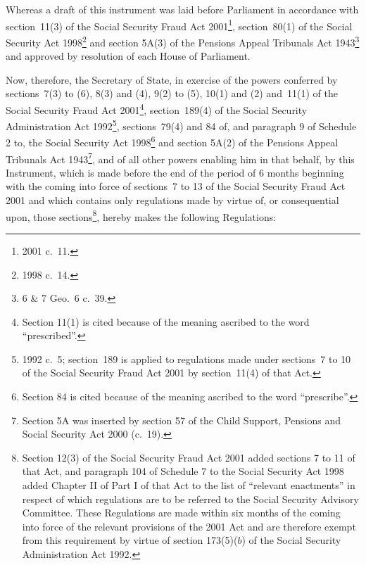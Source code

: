 \documentclass[12pt,a4paper]{article}
\title{\regstitle}
\author{S.I.\ 2001 No.\ 4022}
\date{Made
18th December 2001\\
Coming into force
1st April 2002
}
\begin{document}
\maketitle

\noindent
Whereas a draft of this instrument was laid before Parliament in accordance with section~11(3) of the Social Security Fraud Act 2001\footnote{2001 c.~11.}, section~80(1) of the Social Security Act 1998\footnote{1998 c.~14.} and section 5A(3) of the Pensions Appeal Tribunals Act 1943\footnote{6 \& 7 Geo.~6 c.~39.} and approved by resolution of each House of Parliament.

Now, therefore, the Secretary of State, in exercise of the powers conferred by sections~7(3) to (6), 8(3) and (4), 9(2) to (5), 10(1) and (2) and~11(1) of the Social Security Fraud Act 2001\footnote{Section 11(1) is cited because of the meaning ascribed to the word “prescribed”.}, section~189(4) of the Social Security Administration Act 1992\footnote{1992 c.~5; section~189 is applied to regulations made under sections~7 to 10 of the Social Security Fraud Act 2001 by section~11(4) of that Act.}, sections~79(4) and 84 of, and paragraph 9 of Schedule 2 to, the Social Security Act 1998\footnote{Section 84 is cited because of the meaning ascribed to the word “prescribe”.} and section 5A(2) of the Pensions Appeal Tribunals Act 1943\footnote{Section 5A was inserted by section 57 of the Child Support, Pensions and Social Security Act 2000 (c.~19).}, and of all other powers enabling him in that behalf, by this Instrument, which is made before the end of the period of 6 months beginning with the coming into force of sections~7 to 13 of the Social Security Fraud Act 2001 and which contains only regulations made by virtue of, or consequential upon, those sections\footnote{Section 12(3) of the Social Security Fraud Act 2001 added sections 7 to 11 of that Act, and paragraph 104 of Schedule 7 to the Social Security Act 1998 added Chapter II of Part I of that Act to the list of “relevant enactments” in respect of which regulations are to be referred to the Social Security Advisory Committee. These Regulations are made within six months of the coming into force of the relevant provisions of the 2001 Act and are therefore exempt from this requirement by virtue of section 173(5)($b$) of the Social Security Administration Act 1992.}, hereby makes the following Regulations:  

{\sloppy

\tableofcontents

}
\end{document}
